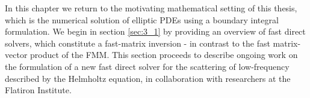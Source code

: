 In this chapter we return to the motivating mathematical setting of this thesis, which is the numerical solution of elliptic PDEs using a boundary integral formulation. We begin in section \ref{sec:3_1} by providing an overview of fast direct solvers, which constitute a fast-matrix inversion - in contrast to the fast matrix-vector product of the FMM. This section proceeds to describe ongoing work on the formulation of a new fast direct solver for the scattering of low-frequency described by the Helmholtz equation, in collaboration with researchers at the Flatiron Institute. 

